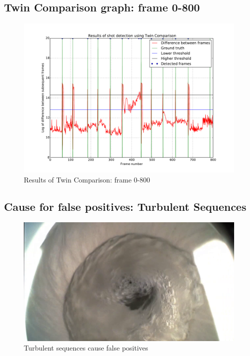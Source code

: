 \begin{appendices}
\newpage
\subsection{Twin Comparison graph: frame 0-800}
\label{app:zoom}

\begin{figure}[!ht]
  \centering
  \includegraphics[page=1,angle=90,height=0.9\textheight,keepaspectratio]{figs/graph_zoom}
  \caption{Results of Twin Comparison: frame 0-800}
  \label{fig:zoom}
\end{figure}

\newpage

\subsection{Cause for false positives: Turbulent Sequences}
\label{app:turbulent}
\begin{figure}[ht]
  \centering
  \includegraphics[width=.85\textwidth]{figs/turbulent}
  \caption{Turbulent sequences cause false positives}
  \label{fig:flush}
\end{figure}



\end{appendices}
